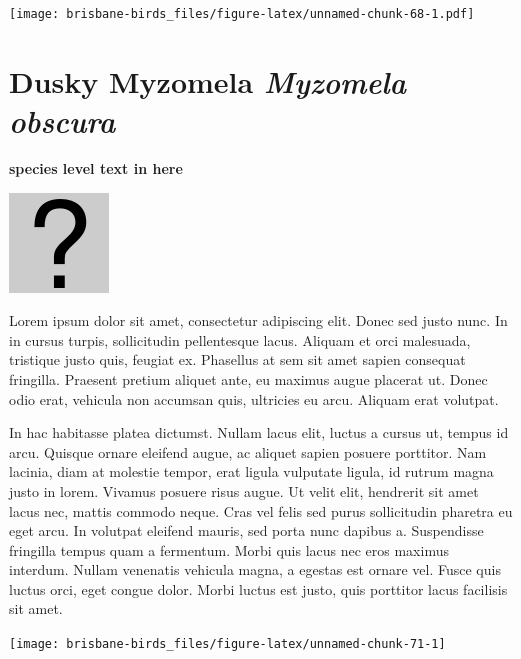 \documentclass[]{book}
\let\origfigure\figure
\let\endorigfigure\endfigure
\renewenvironment{figure}[1][2] {
  \expandafter\origfigure\expandafter[H]
} {
  \endorigfigure
}
\begin{document}
\begin{figure}
\centering
\texttt{[image: brisbane-birds\_files/figure-latex/unnamed-chunk-68-1.pdf]}
\caption{\label{fig:unnamed-chunk-68}insert figure caption}
\end{figure}

\section{\texorpdfstring{Dusky Myzomela \emph{Myzomela
obscura}}{Dusky Myzomela Myzomela obscura}}\label{dusky-myzomela-myzomela-obscura}

\textbf{species level text in here}

\begin{figure}
\centering
\includegraphics{assets/missing.png}
\caption{No image for species}
\end{figure}

Lorem ipsum dolor sit amet, consectetur adipiscing elit. Donec sed justo
nunc. In in cursus turpis, sollicitudin pellentesque lacus. Aliquam et
orci malesuada, tristique justo quis, feugiat ex. Phasellus at sem sit
amet sapien consequat fringilla. Praesent pretium aliquet ante, eu
maximus augue placerat ut. Donec odio erat, vehicula non accumsan quis,
ultricies eu arcu. Aliquam erat volutpat.

In hac habitasse platea dictumst. Nullam lacus elit, luctus a cursus ut,
tempus id arcu. Quisque ornare eleifend augue, ac aliquet sapien posuere
porttitor. Nam lacinia, diam at molestie tempor, erat ligula vulputate
ligula, id rutrum magna justo in lorem. Vivamus posuere risus augue. Ut
velit elit, hendrerit sit amet lacus nec, mattis commodo neque. Cras vel
felis sed purus sollicitudin pharetra eu eget arcu. In volutpat eleifend
mauris, sed porta nunc dapibus a. Suspendisse fringilla tempus quam a
fermentum. Morbi quis lacus nec eros maximus interdum. Nullam venenatis
vehicula magna, a egestas est ornare vel. Fusce quis luctus orci, eget
congue dolor. Morbi luctus est justo, quis porttitor lacus facilisis sit
amet.

\begin{figure}
\texttt{[image: brisbane-birds\_files/figure-latex/unnamed-chunk-71-1]} \caption{insert figure caption}\label{fig:unnamed-chunk-71}
\end{figure}
\end{document}

